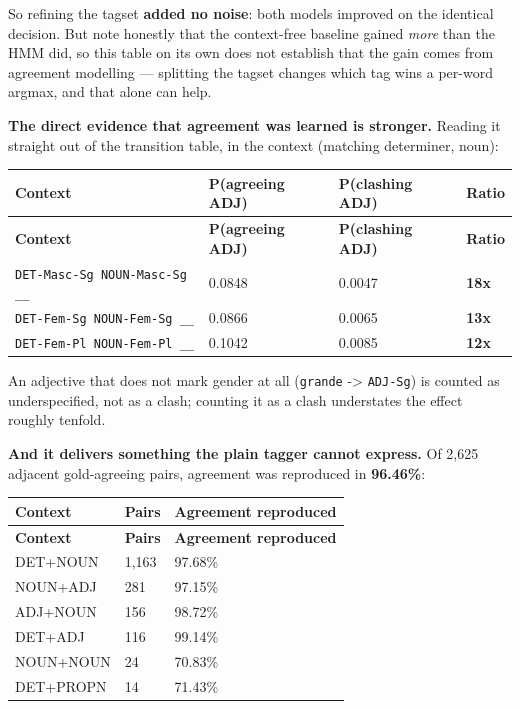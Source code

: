 \documentclass[11pt,a4paper]{article}
\begin{document}
So refining the tagset \textbf{added no noise}: both models improved on the identical decision. But note honestly that the context-free baseline gained \textit{more} than the HMM did, so this table on its own does not establish that the gain comes from agreement modelling --- splitting the tagset changes which tag wins a per-word argmax, and that alone can help.

\textbf{The direct evidence that agreement was learned is stronger.} Reading it straight out of the transition table, in the context (matching determiner, noun):

{\small
\setlength{\tabcolsep}{4pt}
\begin{longtable}{llll}
\toprule
\textbf{Context} & \textbf{P(agreeing ADJ)} & \textbf{P(clashing ADJ)} & \textbf{Ratio} \\
\midrule
\endfirsthead
\toprule
\textbf{Context} & \textbf{P(agreeing ADJ)} & \textbf{P(clashing ADJ)} & \textbf{Ratio} \\
\midrule
\endhead
\texttt{DET-\allowbreak{}Masc-\allowbreak{}Sg NOUN-\allowbreak{}Masc-\allowbreak{}Sg \_\allowbreak{}\_\allowbreak{}} & 0.0848 & 0.0047 & \textbf{18x} \\
\texttt{DET-\allowbreak{}Fem-\allowbreak{}Sg NOUN-\allowbreak{}Fem-\allowbreak{}Sg \_\allowbreak{}\_\allowbreak{}} & 0.0866 & 0.0065 & \textbf{13x} \\
\texttt{DET-\allowbreak{}Fem-\allowbreak{}Pl NOUN-\allowbreak{}Fem-\allowbreak{}Pl \_\allowbreak{}\_\allowbreak{}} & 0.1042 & 0.0085 & \textbf{12x} \\
\bottomrule
\end{longtable}}

An adjective that does not mark gender at all (\texttt{grande} -> \texttt{ADJ-\allowbreak{}Sg}) is counted as underspecified, not as a clash; counting it as a clash understates the effect roughly tenfold.

\textbf{And it delivers something the plain tagger cannot express.} Of 2,625 adjacent gold-agreeing pairs, agreement was reproduced in \textbf{96.46\%}:

{\small
\setlength{\tabcolsep}{4pt}
\begin{longtable}{lll}
\toprule
\textbf{Context} & \textbf{Pairs} & \textbf{Agreement reproduced} \\
\midrule
\endfirsthead
\toprule
\textbf{Context} & \textbf{Pairs} & \textbf{Agreement reproduced} \\
\midrule
\endhead
DET+NOUN & 1,163 & 97.68\% \\
NOUN+ADJ & 281 & 97.15\% \\
ADJ+NOUN & 156 & 98.72\% \\
DET+ADJ & 116 & 99.14\% \\
NOUN+NOUN & 24 & 70.83\% \\
DET+PROPN & 14 & 71.43\% \\
\bottomrule
\end{longtable}}
\end{document}
